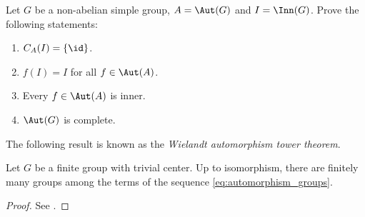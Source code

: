 \begin{exercise}
\label{xca:Aut}
    Let $G$ be a non-abelian simple group, $A=\Aut(G)$ and
    $I=\Inn(G)$. Prove the following statements:
    \begin{enumerate}
        \item $C_A(I)=\{\id\}$. 
        \item $f(I)=I$ for all $f\in \Aut(A)$.
        \item Every $f\in\Aut(A)$ is inner. 
        \item $\Aut(G)$ is complete. 
    \end{enumerate}    
\end{exercise}


The following result is known as the \emph{Wielandt automorphism tower theorem}. 

\begin{theorem}[Wielandt]
    \label{thm:Wielandt:automorphism}
    Let $G$ be a finite group with trivial center. Up to isomorphism, there
    are finitely many groups among the terms of the sequence \eqref{eq:automorphism_groups}.  
\end{theorem}

\begin{proof}
    See \cite[Theorem 9.10]{MR2426855}.
\end{proof}
